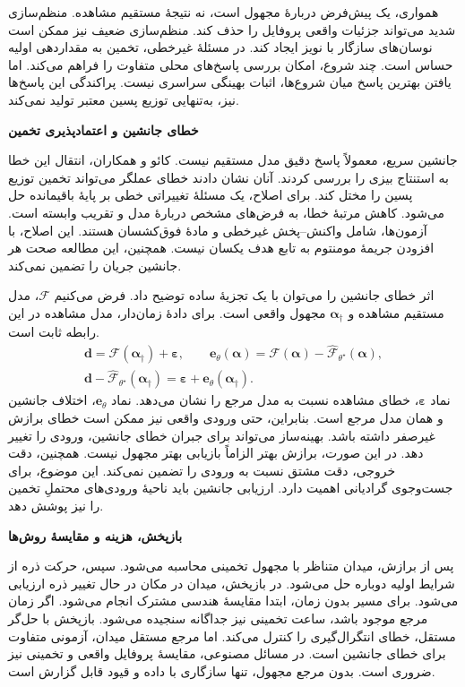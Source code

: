 همواری، یک پیش‌فرض دربارهٔ مجهول است، نه نتیجهٔ مستقیم مشاهده.
منظم‌سازی شدید می‌تواند جزئیات واقعی پروفایل را حذف کند.
منظم‌سازی ضعیف نیز ممکن است نوسان‌های سازگار با نویز ایجاد کند.
در مسئلهٔ غیرخطی، تخمین به مقداردهی اولیه حساس است.
چند شروع، امکان بررسی پاسخ‌های محلی متفاوت را فراهم می‌کند.
اما یافتن بهترین پاسخ میان شروع‌ها، اثبات بهینگی سراسری نیست.
پراکندگی این پاسخ‌ها نیز، به‌تنهایی توزیع پسین معتبر تولید نمی‌کند.

\textbf{خطای جانشین و اعتمادپذیری تخمین}

جانشین سریع، معمولاً پاسخ دقیق مدل مستقیم نیست.
کائو و همکاران، انتقال این خطا به استنتاج بیزی را بررسی کردند.
آنان نشان دادند خطای عملگر می‌تواند تخمین توزیع پسین را مختل کند.
برای اصلاح، یک مسئلهٔ تغییراتی خطی بر پایهٔ باقیمانده حل می‌شود.
کاهش مرتبهٔ خطا، به فرض‌های مشخص دربارهٔ مدل و تقریب وابسته است.
آزمون‌ها، شامل واکنش–پخش غیرخطی و مادهٔ فوق‌کشسان هستند.
این اصلاح، با افزودن جریمهٔ مومنتوم به تابع هدف یکسان نیست.
همچنین، این مطالعه صحت هر جانشین جریان را تضمین نمی‌کند.
\cite{Cao2023ResidualCorrection}

اثر خطای جانشین را می‌توان با یک تجزیهٔ ساده توضیح داد.
فرض می‌کنیم $\mathcal F$، مدل مستقیم مشاهده و $\boldsymbol\alpha_\dagger$ مجهول واقعی است.
برای دادهٔ زمان‌دار، مدل مشاهده در این رابطه ثابت است.
\begin{equation}
\begin{gathered}
\mathbf d=\mathcal F(\boldsymbol\alpha_\dagger)+\boldsymbol\varepsilon,\qquad
\mathbf e_\theta(\boldsymbol\alpha)
=\mathcal F(\boldsymbol\alpha)
-\widehat{\mathcal F}_{\theta^\star}(\boldsymbol\alpha),\\
\mathbf d-\widehat{\mathcal F}_{\theta^\star}(\boldsymbol\alpha_\dagger)
=\boldsymbol\varepsilon+\mathbf e_\theta(\boldsymbol\alpha_\dagger).
\end{gathered}
\label{eq:lit-frozen-surrogate-discrepancy}
\end{equation}
نماد $\boldsymbol\varepsilon$، خطای مشاهده نسبت به مدل مرجع را نشان می‌دهد.
نماد $\mathbf e_\theta$، اختلاف جانشین و همان مدل مرجع است.
بنابراین، حتی ورودی واقعی نیز ممکن است خطای برازش غیرصفر داشته باشد.
بهینه‌ساز می‌تواند برای جبران خطای جانشین، ورودی را تغییر دهد.
در این صورت، برازش بهتر الزاماً بازیابی بهتر مجهول نیست.
همچنین، دقت خروجی، دقت مشتق نسبت به ورودی را تضمین نمی‌کند.
این موضوع، برای جست‌وجوی گرادیانی اهمیت دارد.
ارزیابی جانشین باید ناحیهٔ ورودی‌های محتملِ تخمین را نیز پوشش دهد.

\textbf{بازپخش، هزینه و مقایسهٔ روش‌ها}

پس از برازش، میدان متناظر با مجهول تخمینی محاسبه می‌شود.
سپس، حرکت ذره از شرایط اولیه دوباره حل می‌شود.
در بازپخش، میدان در مکان در حال تغییر ذره ارزیابی می‌شود.
برای مسیر بدون زمان، ابتدا مقایسهٔ هندسی مشترک انجام می‌شود.
اگر زمان مرجع موجود باشد، ساعت تخمینی نیز جداگانه سنجیده می‌شود.
بازپخش با حل‌گر مستقل، خطای انتگرال‌گیری را کنترل می‌کند.
اما مرجع مستقل میدان، آزمونی متفاوت برای خطای جانشین است.
در مسائل مصنوعی، مقایسهٔ پروفایل واقعی و تخمینی نیز ضروری است.
بدون مرجع مجهول، تنها سازگاری با داده و قیود قابل گزارش است.

